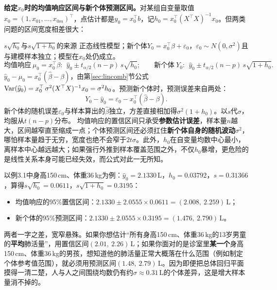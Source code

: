 \textbf{给定$x_0$时的均值响应区间与新个体预测区间。}对某组自变量取值$x_0=(1,x_{01},\ldots,x_{0m})^\top$，点估计都是$\widehat y_0=x_0^\top b$，记$h_0=x_0^\top(X^\top X)^{-1}x_0$。但两类问题的区间宽度相差很大：
\begin{derivation}{$s\sqrt{h_0}$与$s\sqrt{1+h_0}$的来源}
正态线性模型；新个体$Y_0=x_0^\top\beta+\varepsilon_0$，$\varepsilon_0\sim N(0,\sigma^2)$且与建模样本独立；模型在$x_0$处仍成立。
\[
\text{均值响应}\ \mu_0=x_0^\top\beta:\ \ \widehat y_0\pm t_{\alpha/2}(n-p)\,s\sqrt{h_0};\qquad
\text{新个体}\ Y_0:\ \ \widehat y_0\pm t_{\alpha/2}(n-p)\,s\sqrt{1+h_0}.
\]
$\widehat y_0-\mu_0=x_0^\top(\widehat\beta-\beta)$，由第\ref{sec:lincomb}节公式$\operatorname{Var}(\widehat y_0)=x_0^\top\,\sigma^2(X^\top X)^{-1}x_0=\sigma^2h_0$。预测新个体时，预测误差来自两处：
\[
Y_0-\widehat y_0=\varepsilon_0-x_0^\top(\widehat\beta-\beta).
\]
新个体的随机误差$\varepsilon_0$与样本算出的$\widehat\beta$独立，方差直接相加得$\sigma^2(1+h_0)$。以$s$代$\sigma$，均服从$t(n-p)$分布。
均值响应的置信区间只承受\textbf{参数估计误差}，样本量$n$越大，区间越窄直至缩成一点；个体预测区间还必须扛住\textbf{新个体自身的随机波动}$\sigma^2$，哪怕样本量趋于无穷，宽度也绝不会窄于$2t\sigma$。此外，$h_0$在自变量均数中心最小，离样本中心越远越大；如果强行外推到样本覆盖范围之外，不仅$h_0$暴增，更危险的是线性关系本身可能已经失效，而公式对此一无所知。
\end{derivation}

以例3.1中身高150\,cm、体重36\,kg为例：$\widehat y_0=2.1330$\,L，$h_0=0.03792$，$s=0.31366$，算得$s\sqrt{h_0}=0.0611$，$s\sqrt{1+h_0}=0.3195$：
\begin{itemize}
\item 均值响应的95\%置信区间：$2.1330\pm2.0555\times0.0611=(2.008,\ 2.259)$\,L；
\item 新个体的95\%预测区间：$2.1330\pm2.0555\times0.3195=(1.476,\ 2.790)$\,L。
\end{itemize}
\begin{sikao}
两者一字之差，宽窄悬殊。如果你想估计“所有身高150\,cm、体重36\,kg的13岁男童的\textbf{平均}肺活量”，用置信区间$(2.01,\ 2.26)$\,L；如果你面对的是诊室里\textbf{某一个}身高150\,cm、体重36\,kg的男孩，想知道他的肺活量正常大概落在什么范围（例如制定个体参考值范围），就必须用预测区间$(1.48,\ 2.79)$\,L。因为即便把总体回归平面摸得一清二楚，人与人之间围绕均数仍有约$\sigma\approx 0.31$\,L的个体差异，这是增大样本量消不掉的。
\end{sikao}

